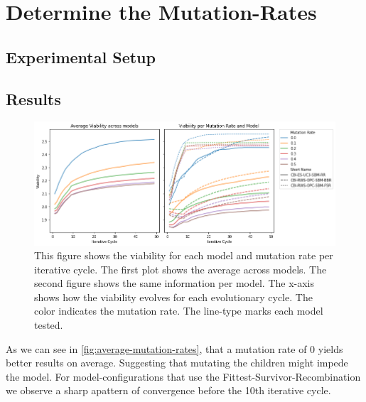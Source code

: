 \documentclass[./../../paper.tex]{subfiles}
\begin{document}
\section{Determine the Mutation-Rates}

\subsection{Experimental Setup}
\label{sec:exp2}


\subsection{Results}

\begin{figure}[htbp]
    \centering
    \includegraphics[width=\textwidth]{figures/generated/exp2_viability_by_mrate_model.png}
    \caption{This figure shows the viability for each model and mutation rate per iterative cycle. The first plot shows the average across models. The second figure shows the same information per model. The x-axis shows how the viability evolves for each evolutionary cycle. The color indicates the mutation rate. The line-type marks each model tested.}
    \label{fig:average-mutation-rates}
\end{figure}


\noindent As we can see in \autoref{fig:average-mutation-rates}, that a mutation rate of 0 yields better results on average. Suggesting that mutating the children might impede the model. 
For model-configurations that use the Fittest-Survivor-Recombination we observe a sharp apattern of convergence before the 10th iterative cycle.  
\end{document}
